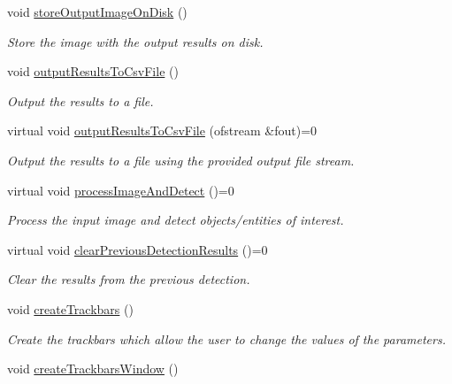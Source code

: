 \begin{DoxyCompactItemize}
void \hyperlink{classmultiscale_1_1analysis_1_1Detector_aa15a7546c4f8f77fcf85632386a4c5d5}{store\-Output\-Image\-On\-Disk} ()
\begin{DoxyCompactList}\small\item\em Store the image with the output results on disk. \end{DoxyCompactList}\item 
void \hyperlink{classmultiscale_1_1analysis_1_1Detector_a2055dc183dd3601d9979bc99a3222eb4}{output\-Results\-To\-Csv\-File} ()
\begin{DoxyCompactList}\small\item\em Output the results to a file. \end{DoxyCompactList}\item 
virtual void \hyperlink{classmultiscale_1_1analysis_1_1Detector_afc247b9c7ded2ffde3ba0cb2b1267490}{output\-Results\-To\-Csv\-File} (ofstream \&fout)=0
\begin{DoxyCompactList}\small\item\em Output the results to a file using the provided output file stream. \end{DoxyCompactList}\item 
virtual void \hyperlink{classmultiscale_1_1analysis_1_1Detector_a7451855e415300f15765082f21588f13}{process\-Image\-And\-Detect} ()=0
\begin{DoxyCompactList}\small\item\em Process the input image and detect objects/entities of interest. \end{DoxyCompactList}\item 
virtual void \hyperlink{classmultiscale_1_1analysis_1_1Detector_a3c2add35193ad09a0200003d0053da6b}{clear\-Previous\-Detection\-Results} ()=0
\begin{DoxyCompactList}\small\item\em Clear the results from the previous detection. \end{DoxyCompactList}\item 
void \hyperlink{classmultiscale_1_1analysis_1_1Detector_a3d406aaa4dc8e9f8adbee3d7818cf1de}{create\-Trackbars} ()
\begin{DoxyCompactList}\small\item\em Create the trackbars which allow the user to change the values of the parameters. \end{DoxyCompactList}\item 
void \hyperlink{classmultiscale_1_1analysis_1_1Detector_afdf4c74184888dbd112d0f1cec3776cd}{create\-Trackbars\-Window} ()

\end{DoxyCompactItemize}

